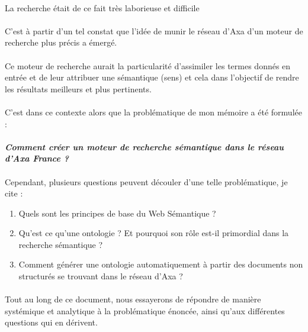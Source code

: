 \documentclass[12pt, a4paper, oneside]{book}
\begin{document}
 
\paragraph{}
La recherche était de ce fait très laborieuse et difficile
\paragraph{}
C'est à partir d'un tel constat que l'idée de munir le réseau d'Axa d'un moteur de recherche plus précis a émergé.


\paragraph{}
Ce moteur de recherche aurait la particularité d'assimiler les termes donnés en entrée et de leur attribuer une sémantique (sens) et cela dans l'objectif de rendre les résultats meilleurs et plus pertinents.


\paragraph{}
C'est dans ce contexte alors que la problématique de mon mémoire a été formulée : 

\paragraph{}
\emph{\textbf{Comment créer un moteur de recherche sémantique dans le réseau d'Axa France ?} 
}

\paragraph{}
Cependant, plusieurs questions peuvent découler d'une telle problématique, je cite : 

\begin{enumerate}


\item Quels sont les principes de base du Web Sémantique ?
\item Qu'est ce qu'une ontologie ?  Et pourquoi son rôle est-il primordial dans la recherche sémantique ? 
\item Comment générer une ontologie automatiquement à partir des documents non structurés se trouvant dans le réseau d'Axa ? 


\end{enumerate}



\paragraph{}
Tout au long de ce document, nous essayerons de répondre de manière systémique et analytique à la problématique énoncée, ainsi qu'aux différentes questions qui en dérivent. 
\end{document}
